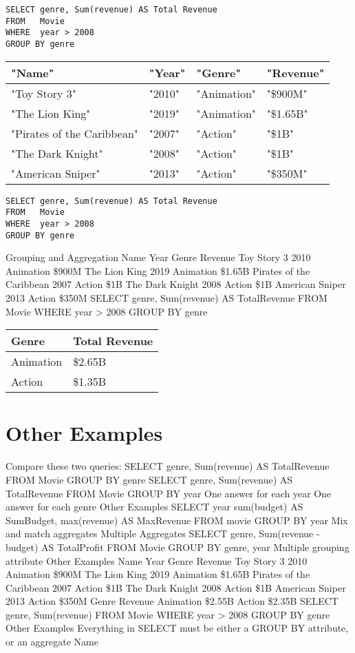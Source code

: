 \documentclass{article}
\begin{document}
\begin{verbatim}
SELECT genre, Sum(revenue) AS Total Revenue
FROM   Movie
WHERE  year > 2008
GROUP BY genre
\end{verbatim}

\begin{tabular}{llll}
\hline
"Name" & "Year" & "Genre" & "Revenue" \\
\hline
"Toy Story 3" & "2010" & "Animation" & "\$900M" \\
"The Lion King" & "2019" & "Animation" & "\$1.65B" \\
"Pirates of the Caribbean" & "2007" & "Action" & "\$1B" \\
"The Dark Knight" & "2008" & "Action" & "\$1B" \\
"American Sniper" & "2013" & "Action" & "\$350M" \\
\hline
\end{tabular}

\begin{verbatim}
SELECT genre, Sum(revenue) AS Total Revenue
FROM   Movie
WHERE  year > 2008
GROUP BY genre
\end{verbatim}

Grouping and Aggregation Name Year Genre Revenue Toy Story 3 2010 Animation \$900M The Lion King 2019 Animation \$1.65B Pirates of the Caribbean 2007 Action \$1B The Dark Knight 2008 Action \$1B American Sniper 2013 Action \$350M SELECT genre, Sum(revenue) AS TotalRevenue FROM Movie WHERE year > 2008 GROUP BY genre

\begin{tabular}{ll}
\hline
Genre & Total Revenue \\
\hline
Animation & \$2.65B \\
Action & \$1.35B \\
\hline
\end{tabular}

\section*{Other Examples}

Compare these two queries: SELECT genre, Sum(revenue) AS TotalRevenue FROM Movie GROUP BY genre SELECT genre, Sum(revenue) AS TotalRevenue FROM Movie GROUP BY year One answer for each year One answer for each genre Other Examples SELECT year sum(budget) AS SumBudget, max(revenue) AS MaxRevenue FROM movie GROUP BY year Mix and match aggregates Multiple Aggregates SELECT genre, Sum(revenue - budget) AS TotalProfit FROM Movie GROUP BY genre, year Multiple grouping attribute Other Examples Name Year Genre Revenue Toy Story 3 2010 Animation \$900M The Lion King 2019 Animation \$1.65B Pirates of the Caribbean 2007 Action \$1B The Dark Knight 2008 Action \$1B American Sniper 2013 Action \$350M Genre Revenue Animation \$2.55B Action \$2.35B SELECT genre, Sum(revenue) FROM Movie WHERE year > 2008 GROUP BY genre Other Examples Everything in SELECT must be either a GROUP BY attribute, or an aggregate Name
\end{document}
